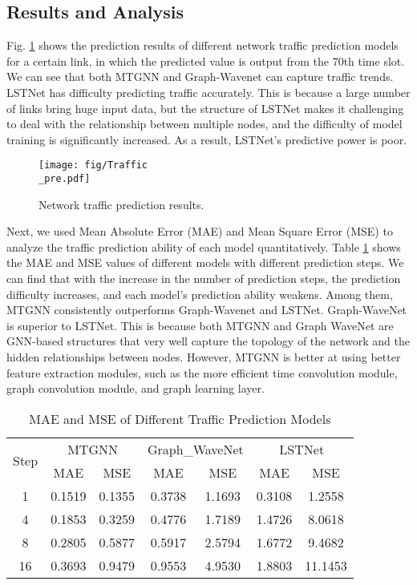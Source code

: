 \documentclass[journal]{IEEEtran}
\begin{document}
\subsection{Results and Analysis}

Fig. \ref{fig10} shows the prediction results of different network traffic prediction models for a certain link, in which the predicted value is output from the 70th time slot. We can see that both MTGNN and Graph-Wavenet can capture traffic trends. LSTNet has difficulty predicting traffic accurately. This is because a large number of links bring huge input data, but the structure of LSTNet makes it challenging to deal with the relationship between multiple nodes, and the difficulty of model training is significantly increased. As a result, LSTNet's predictive power is poor.

\begin{figure}
\centering
\setlength{\abovecaptionskip}{0.cm}
\texttt{[image: fig/Traffic\\\_pre.pdf]}
\caption{Network traffic prediction results. }
\label{fig10}
\vspace{-0.1cm}
\end{figure}

Next, we used Mean Absolute Error (MAE) and Mean Square Error (MSE) to analyze the traffic prediction ability of each model quantitatively. Table \ref{tab2} shows the MAE and MSE values of different models with different prediction steps. We can find that with the increase in the number of prediction steps, the prediction difficulty increases, and each model's prediction ability weakens. Among them, MTGNN consistently outperforms Graph-Wavenet and LSTNet. Graph-WaveNet is superior to LSTNet. This is because both MTGNN and Graph WaveNet are GNN-based structures that very well capture the topology of the network and the hidden relationships between nodes. However, MTGNN is better at using better feature extraction modules, such as the more efficient time convolution module, graph convolution module, and graph learning layer.



\begin{table}  
\centering 
\caption{MAE and MSE of Different Traffic Prediction Models} 
\label{tab2} 
\begin{tabular}{c|cc|cc|cc}   
\hline   
\multirow{2}{*}{Step} & \multicolumn{2}{c|}{MTGNN} & \multicolumn{2}{c|}{Graph\_WaveNet} & \multicolumn{2}{c}{LSTNet} \\   
\cline{2-7} %
 & MAE & MSE & MAE & MSE & MAE & MSE \\   
\hline  

1 & 0.1519 & 0.1355 & 0.3738 & 1.1693 & 0.3108 & 1.2558 \\  
4 & 0.1853 & 0.3259 & 0.4776 & 1.7189 & 1.4726 & 8.0618 \\  
8 & 0.2805 & 0.5877 & 0.5917 & 2.5794 & 1.6772 & 9.4682 \\  
16 & 0.3693 & 0.9479 & 0.9553 & 4.9530 & 1.8803 & 11.1453 \\  
\hline  
\end{tabular}  
\end{table}  
\end{document}
